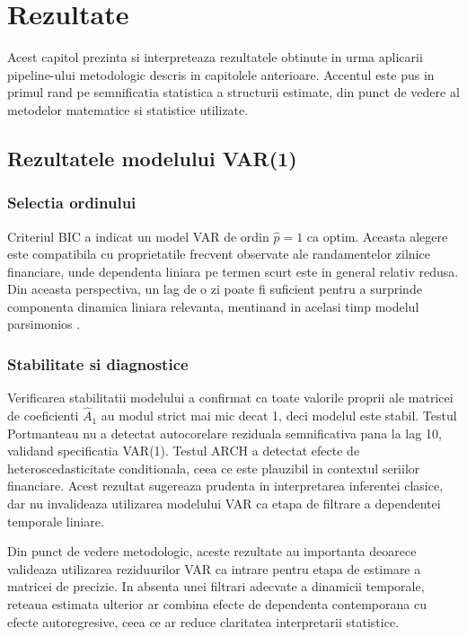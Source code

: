\chapter{Rezultate}

Acest capitol prezinta si interpreteaza rezultatele obtinute in urma aplicarii
pipeline-ului metodologic descris in capitolele anterioare. Accentul este pus in primul rand pe semnificatia statistica a structurii estimate,
din punct de vedere al metodelor matematice si statistice utilizate.

\section{Rezultatele modelului VAR(1)}

\subsection{Selectia ordinului}

Criteriul BIC a indicat un model VAR de ordin $\hat{p} = 1$ ca optim. Aceasta
alegere este compatibila cu proprietatile frecvent observate ale randamentelor
zilnice financiare, unde dependenta liniara pe termen scurt este in general
relativ redusa. Din aceasta perspectiva, un lag de o zi poate fi suficient
pentru a surprinde componenta dinamica liniara relevanta, mentinand in acelasi
timp modelul parsimonios \citep{fama1970,tsay2010,lutkepohl2005}.

\subsection{Stabilitate si diagnostice}

Verificarea stabilitatii modelului a confirmat ca toate valorile proprii ale
matricei de coeficienti $\hat{A}_1$ au modul strict mai mic decat 1, deci
modelul este stabil. Testul Portmanteau nu a detectat autocorelare reziduala
semnificativa pana la lag 10, validand specificatia VAR(1). Testul ARCH a detectat efecte de heteroscedasticitate conditionala, ceea ce este
plauzibil in contextul seriilor financiare. Acest rezultat sugereaza prudenta in
interpretarea inferentei clasice, dar nu invalideaza utilizarea modelului VAR ca
etapa de filtrare a dependentei temporale liniare.

Din punct de vedere metodologic, aceste rezultate au importanta deoarece
valideaza utilizarea reziduurilor VAR ca intrare pentru etapa de estimare a
matricei de precizie. In absenta unei filtrari adecvate a dinamicii temporale,
reteaua estimata ulterior ar combina efecte de dependenta contemporana cu efecte
autoregresive, ceea ce ar reduce claritatea interpretarii statistice.

